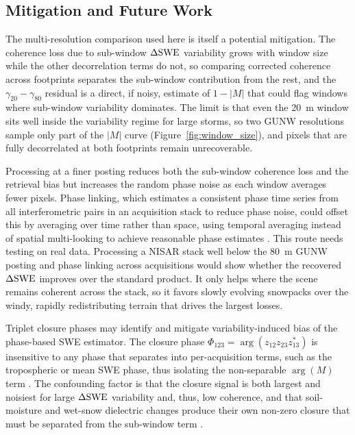 \documentclass[journal abbreviation, manuscript]{copernicus}
\begin{document}
\subsection{Mitigation and Future Work}\label{subsec:mitigation}

The multi-resolution comparison used here is itself a potential mitigation. The coherence loss due to sub-window $\Delta\mathrm{SWE}$ variability grows with window size while the other decorrelation terms do not, so comparing corrected coherence across footprints separates the sub-window contribution from the rest, and the $\gamma_{20}-\gamma_{80}$ residual is a direct, if noisy, estimate of $1-|M|$ that could flag windows where sub-window variability dominates. The limit is that even the 20~m window sits well inside the variability regime for large storms, so two GUNW resolutions sample only part of the $|M|$ curve (Figure~\ref{fig:window_size}), and pixels that are fully decorrelated at both footprints remain unrecoverable.

Processing at a finer posting reduces both the sub-window coherence loss and the retrieval bias but increases the random phase noise as each window averages fewer pixels. Phase linking, which estimates a consistent phase time series from all interferometric pairs in an acquisition stack to reduce phase noise, could offset this by averaging over time rather than space, using temporal averaging instead of spatial multi-looking to achieve reasonable phase estimates \citep{Guarnieri2008, ansari2017sequential-aff, eppler2022adapting-c4d, zwieback2022cheap-026}. This route needs testing on real data. Processing a NISAR stack well below the 80~m GUNW posting and phase linking across acquisitions would show whether the recovered $\Delta\mathrm{SWE}$ improves over the standard product. It only helps where the scene remains coherent across the stack, so it favors slowly evolving snowpacks over the windy, rapidly redistributing terrain that drives the largest losses.

Triplet closure phases may identify and mitigate variability-induced bias of the phase-based SWE estimator. The closure phase $\Phi_{123}=\arg(z_{12}z_{23}z_{13}^{*})$
is insensitive to any phase that separates into per-acquisition terms, such as the tropospheric or mean SWE phase, thus isolating the non-separable $\arg(M)$ term \citep{zwieback2024temporal-426}. The confounding factor is that the closure signal is both largest and noisiest for large $\Delta\mathrm{SWE}$ variability and, thus, low coherence, and that soil-moisture and wet-snow dielectric changes produce their own non-zero closure that must be separated from the sub-window term \citep{Zan2014, zwieback2016statistical-d35}. 
\end{document}
